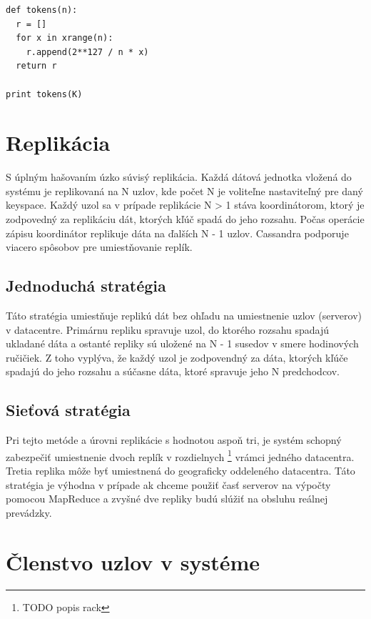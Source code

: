\documentclass[11pt,twoside,a4paper]{book}
\begin{document}
\begin{verbatim}
def tokens(n):
  r = []
  for x in xrange(n):
    r.append(2**127 / n * x)
  return r

print tokens(K)
\end{verbatim}




\section{Replikácia}

S úplným hašovaním úzko súvisý replikácia. Každá dátová jednotka vložená do systému je replikovaná na N uzlov, kde počet N je voliteľne nastaviteľný pre daný keyspace. Každý uzol sa v prípade replikácie N > 1 stáva koordinátorom, ktorý je zodpovedný za replikáciu dát, ktorých kľúč spadá do jeho rozsahu. Počas operácie zápisu koordinátor replikuje dáta na ďalších N - 1 uzlov. Cassandra podporuje viacero spôsobov pre umiestňovanie replík.

\subsection*{Jednoduchá stratégia}

Táto stratégia umiestňuje replikú dát bez ohľadu na umiestnenie uzlov (serverov) v datacentre. Primárnu repliku spravuje uzol, do ktorého rozsahu spadajú ukladané dáta a ostanté repliky sú uložené na N - 1 susedov v smere hodinových ručičiek. Z toho vyplýva, že každý uzol je zodpovendný za dáta, ktorých kľúče spadajú do jeho rozsahu a súčasne dáta, ktoré spravuje jeho N predchodcov.

\subsection*{Sieťová stratégia}

Pri tejto metóde a úrovni replikácie s hodnotou aspoň tri, je systém schopný zabezpečiť umiestnenie dvoch replík v rozdielnych \emph{}\footnote{TODO popis rack} vrámci jedného datacentra. Tretia replika môže byť umiestnená do geograficky oddeleného datacentra. Táto stratégia je výhodna v prípade ak chceme použiť časť serverov na výpočty pomocou MapReduce a zvyšné dve repliky budú slúžiť na obsluhu reálnej prevádzky.

\section{Členstvo uzlov v systéme}
\end{document}
